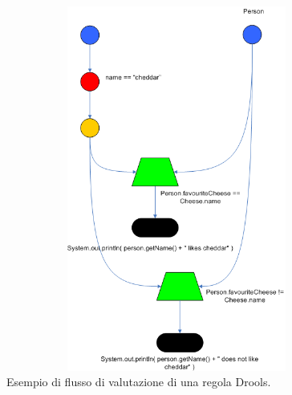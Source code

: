  	
 	\begin{figure}[H]
 		\begin{center}
 			\includegraphics[width=12cm,height=12cm,keepaspectratio]{Pics/drools_rule_flow_example.png}
 			\caption{Esempio di flusso di valutazione di una regola Drools.}
 			\label{fig:DroolsRuleEvalFlow}
 		\end{center}
 	\end{figure}
 	